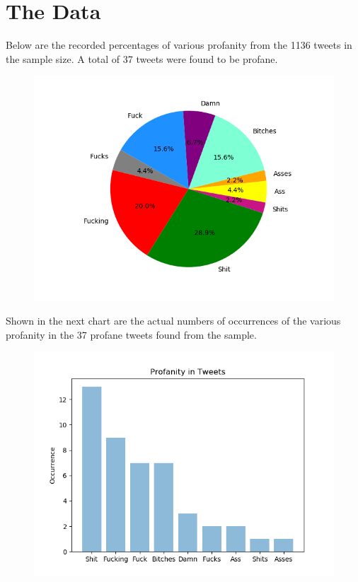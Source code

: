 \documentclass{article}
\begin{document}
\section{The Data}
\tab Below are the recorded percentages of various profanity from the 1136 tweets in the sample size. A total of 37 tweets were found to be profane.
\begin{figure}[h]
	\includegraphics[scale=.7]{Figure_1}
\end{figure}

\newpage
Shown in the next chart are the actual numbers of occurrences of the various profanity in the 37 profane tweets found from the sample.

\begin{figure}[h]
	\includegraphics[scale=1]{Figure_2}
\end{figure}
\end{document}
